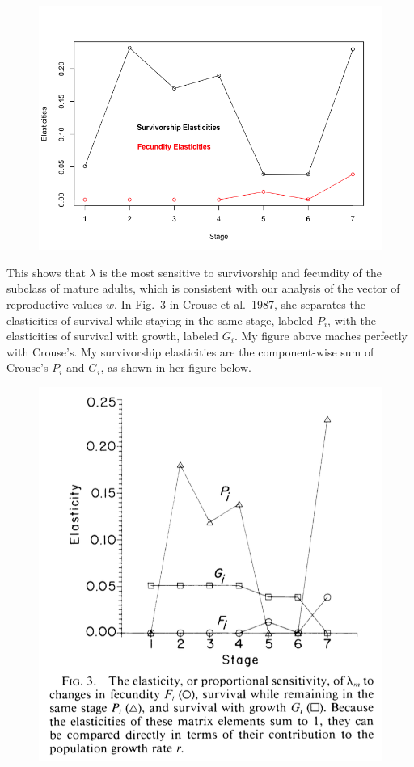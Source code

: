 \documentclass{article} %
\theoremstyle{plain}
\numberwithin{equation}{section} %
\numberwithin{figure}{section} %
\numberwithin{table}{section} %
\begin{document}
\begin{enumerate}[\ \ (a)]
\begin{figure}[ht!]
            \includegraphics[scale=0.45]{figure_1e.png}
        \end{figure}
        \FloatBarrier
        This shows that $\lambda$ is the most sensitive to survivorship and fecundity of the subclass of mature adults, which is consistent with our analysis of the vector of reproductive values $w$.  In Fig.~3 in Crouse et al.~1987, she separates the elasticities of survival while staying in the same stage, labeled $P_i$, with the elasticities of survival with growth, labeled $G_i$.  My figure above maches perfectly with Crouse's.  My survivorship elasticities are the component-wise sum of Crouse's $P_i$ and $G_i$, as shown in her figure below.
        \begin{figure}[ht!]
            \centering
            \includegraphics[scale=0.6]{Crouse_et_al_fig_3.png}
        \end{figure}
\end{enumerate}
\end{document}
